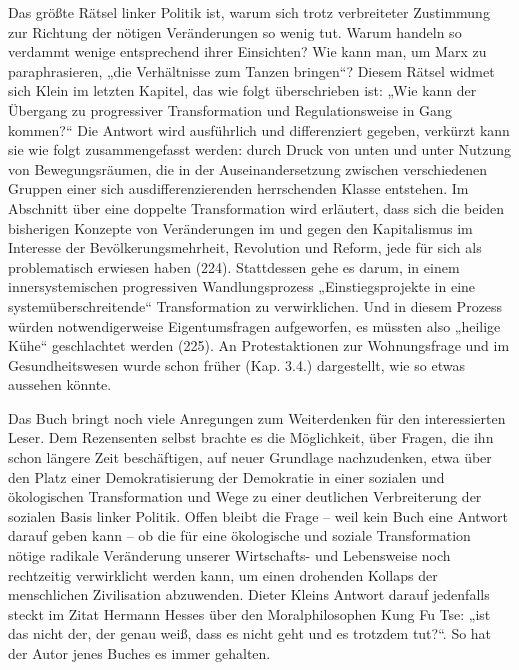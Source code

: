 \begin{multicols*}{2}
    Das größte Rätsel linker Politik ist, warum sich trotz verbreiteter Zustimmung zur Richtung der nötigen Veränderungen so wenig tut. Warum handeln so verdammt wenige entsprechend ihrer Einsichten? Wie kann man, um Marx zu paraphrasieren, „die Verhältnisse zum Tanzen bringen“? Diesem Rätsel widmet sich Klein im letzten Kapitel, das wie folgt überschrieben ist: „Wie kann der Übergang zu progressiver Transformation und Regulationsweise in Gang kommen?“ Die Antwort wird ausführlich und differenziert gegeben, verkürzt kann sie wie folgt zusammengefasst werden: durch Druck von unten und unter Nutzung von Bewegungsräumen, die in der Auseinandersetzung zwischen verschiedenen Gruppen einer sich ausdifferenzierenden herrschenden Klasse entstehen. Im Abschnitt über eine doppelte Transformation wird erläutert, dass sich die beiden bisherigen Konzepte von Veränderungen im und gegen den Kapitalismus im Interesse der Bevölkerungsmehrheit, Revolution und Reform, jede für sich als problematisch erwiesen haben (224). Stattdessen gehe es darum, in einem innersystemischen progressiven Wandlungsprozess „Einstiegsprojekte in eine systemüberschreitende“ Transformation zu verwirklichen. Und in diesem Prozess würden notwendigerweise Eigentumsfragen aufgeworfen, es müssten also „heilige Kühe“ geschlachtet werden (225). An Protestaktionen zur Wohnungsfrage und im Gesundheitswesen wurde schon früher (Kap. 3.4.) dargestellt, wie so etwas aussehen könnte. 

    Das Buch bringt noch viele Anregungen zum Weiterdenken für den interessierten Leser. Dem Rezensenten selbst brachte es die Möglichkeit, über Fragen, die ihn schon längere Zeit beschäftigen, auf neuer Grundlage nachzudenken, etwa über den Platz einer Demokratisierung der Demokratie in einer sozialen und ökologischen Transformation und Wege zu einer deutlichen Verbreiterung der sozialen Basis linker Politik. Offen bleibt die Frage – weil kein Buch eine Antwort darauf geben kann – ob die für eine ökologische und soziale Transformation nötige radikale Veränderung unserer Wirtschafts- und Lebensweise noch rechtzeitig verwirklicht werden kann, um einen drohenden Kollaps der menschlichen Zivilisation abzuwenden. Dieter Kleins Antwort darauf jedenfalls steckt im Zitat Hermann Hesses über den Moralphilosophen Kung Fu Tse: „ist das nicht der, der genau weiß, dass es nicht geht und es trotzdem tut?“. So hat der Autor jenes Buches es immer gehalten. \\\bigskip

\end{multicols*}